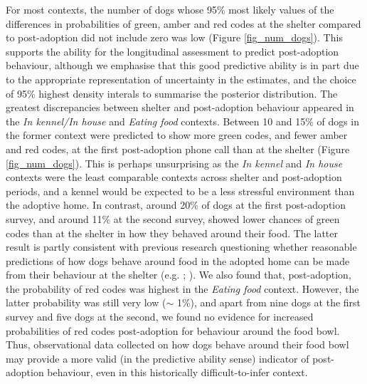 \documentclass[12pt]{article}
\begin{document}
For most contexts, the number of dogs whose 95\% most likely values of the differences in probabilities of green, amber and red codes at the shelter compared to post-adoption did not include zero was low (Figure \ref{fig_num_dogs}). This supports the ability for the longitudinal assessment to predict post-adoption behaviour, although we emphasise that this good predictive ability is in part due to the appropriate representation of uncertainty in the estimates, and the choice of 95\% highest density interals to summarise the posterior distribution. The greatest discrepancies between shelter and post-adoption behaviour appeared in the \textit{In kennel/In house} and \textit{Eating food} contexts. Between 10 and 15\% of dogs in the former context were predicted to show more green codes, and fewer amber and red codes, at the first post-adoption phone call than at the shelter (Figure \ref{fig_num_dogs}). This is perhaps unsurprising as the \textit{In kennel} and \textit{In house} contexts were the least comparable contexts across shelter and post-adoption periods, and a kennel would be expected to be a less stressful environment than the adoptive home. In contrast, around 20\% of dogs at the first post-adoption survey, and around 11\% at the second survey, showed lower chances of green codes than at the shelter in how they behaved around their food. The latter result is partly consistent with previous research questioning whether reasonable predictions of how dogs behave around food in the adopted home can be made from their behaviour at the shelter (e.g. \cite{marder2013}; \cite{mohangibbons2012}). We also found that, post-adoption, the probability of red codes was highest in the \textit{Eating food} context. However, the latter probability was still very low ($\sim$ 1\%), and apart from nine dogs at the first survey and five dogs at the second, we found no evidence for increased probabilities of red codes post-adoption for behaviour around the food bowl. Thus, observational data collected on how dogs behave around their food bowl may provide a more valid (in the predictive ability sense) indicator of post-adoption behaviour, even in this historically difficult-to-infer context.
\end{document}

